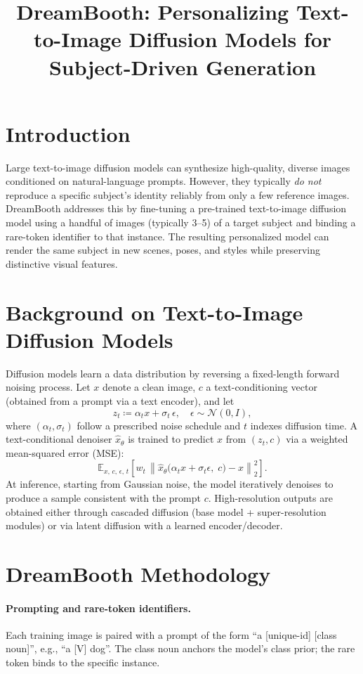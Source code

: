 \documentclass[11pt]{article}
\title{DreamBooth: Personalizing Text-to-Image Diffusion Models for Subject-Driven Generation}
\author{}
\date{}
\begin{document}
\maketitle

\section{Introduction}
Large text-to-image diffusion models can synthesize high-quality, diverse images conditioned on natural-language prompts. However, they typically \emph{do not} reproduce a specific subject's identity reliably from only a few reference images. DreamBooth addresses this by fine-tuning a pre-trained text-to-image diffusion model using a handful of images (typically 3--5) of a target subject and binding a rare-token identifier to that instance. The resulting personalized model can render the same subject in new scenes, poses, and styles while preserving distinctive visual features.

\section{Background on Text-to-Image Diffusion Models}
Diffusion models learn a data distribution by reversing a fixed-length forward noising process. Let $x$ denote a clean image, $c$ a text-conditioning vector (obtained from a prompt via a text encoder), and let
\[
  z_t \coloneqq \alpha_t x + \sigma_t \,\epsilon,
  \quad \epsilon \sim \mathcal{N}(0, I),
\]
where $(\alpha_t, \sigma_t)$ follow a prescribed noise schedule and $t$ indexes diffusion time. A text-conditional denoiser $\hat{x}_{\theta}$ is trained to predict $x$ from $(z_t, c)$ via a weighted mean-squared error (MSE):
\begin{equation}
  \mathbb{E}_{x,\,c,\,\epsilon,\,t}\!\left[
    w_t\,\left\lVert \hat{x}_{\theta}\!\big(\alpha_t x + \sigma_t \epsilon,\; c\big) - x \right\rVert_2^2
  \right].
  \label{eq:base-mse}
\end{equation}
At inference, starting from Gaussian noise, the model iteratively denoises to produce a sample consistent with the prompt $c$. High-resolution outputs are obtained either through cascaded diffusion (base model + super-resolution modules) or via latent diffusion with a learned encoder/decoder.

\section{DreamBooth Methodology}
\paragraph{Prompting and rare-token identifiers.}
Each training image is paired with a prompt of the form ``a [unique-id] [class noun]'', e.g., ``a [V] dog''. The class noun anchors the model's class prior; the rare token binds to the specific instance.
\end{document}

